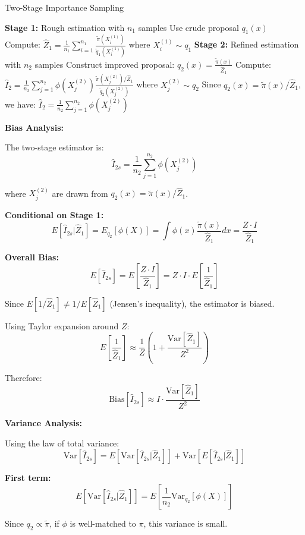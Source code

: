 \documentclass[11pt]{article}
\begin{document}
\begin{algorithm}
\caption{Two-Stage Importance Sampling}
\begin{algorithmic}[1]
\STATE \textbf{Stage 1:} Rough estimation with $n_1$ samples
\STATE Use crude proposal $q_1(x)$
\STATE Compute: $\hat{Z}_1 = \frac{1}{n_1}\sum_{i=1}^{n_1} \frac{\tilde{\pi}(X_i^{(1)})}{\tilde{q}_1(X_i^{(1)})}$ where $X_i^{(1)} \sim q_1$
\STATE \textbf{Stage 2:} Refined estimation with $n_2$ samples
\STATE Construct improved proposal: $q_2(x) = \frac{\tilde{\pi}(x)}{\hat{Z}_1}$
\STATE Compute: $\hat{I}_2 = \frac{1}{n_2}\sum_{j=1}^{n_2} \phi(X_j^{(2)}) \frac{\tilde{\pi}(X_j^{(2)})/\hat{Z}_1}{\tilde{q}_2(X_j^{(2)})}$ where $X_j^{(2)} \sim q_2$
\STATE Since $q_2(x) = \tilde{\pi}(x)/\hat{Z}_1$, we have: $\hat{I}_2 = \frac{1}{n_2}\sum_{j=1}^{n_2} \phi(X_j^{(2)})$
\end{algorithmic}
\end{algorithm}

\textbf{Bias Analysis:}

The two-stage estimator is:
$$\hat{I}_{2s} = \frac{1}{n_2}\sum_{j=1}^{n_2} \phi(X_j^{(2)})$$

where $X_j^{(2)}$ are drawn from $q_2(x) = \tilde{\pi}(x)/\hat{Z}_1$.

\textbf{Conditional on Stage 1:}
$$E[\hat{I}_{2s}|\hat{Z}_1] = E_{q_2}[\phi(X)] = \int \phi(x) \frac{\tilde{\pi}(x)}{\hat{Z}_1}dx = \frac{Z \cdot I}{\hat{Z}_1}$$

\textbf{Overall Bias:}
$$E[\hat{I}_{2s}] = E\left[\frac{Z \cdot I}{\hat{Z}_1}\right] = Z \cdot I \cdot E\left[\frac{1}{\hat{Z}_1}\right]$$

Since $E[1/\hat{Z}_1] \neq 1/E[\hat{Z}_1]$ (Jensen's inequality), the estimator is biased.

Using Taylor expansion around $Z$:
$$E\left[\frac{1}{\hat{Z}_1}\right] \approx \frac{1}{Z}\left(1 + \frac{\text{Var}[\hat{Z}_1]}{Z^2}\right)$$

Therefore:
$$\text{Bias}[\hat{I}_{2s}] \approx I \cdot \frac{\text{Var}[\hat{Z}_1]}{Z^2}$$

\textbf{Variance Analysis:}

Using the law of total variance:
$$\text{Var}[\hat{I}_{2s}] = E[\text{Var}[\hat{I}_{2s}|\hat{Z}_1]] + \text{Var}[E[\hat{I}_{2s}|\hat{Z}_1]]$$

\textbf{First term:}
$$E[\text{Var}[\hat{I}_{2s}|\hat{Z}_1]] = E\left[\frac{1}{n_2}\text{Var}_{q_2}[\phi(X)]\right]$$

Since $q_2 \propto \tilde{\pi}$, if $\phi$ is well-matched to $\pi$, this variance is small.
\end{document}
